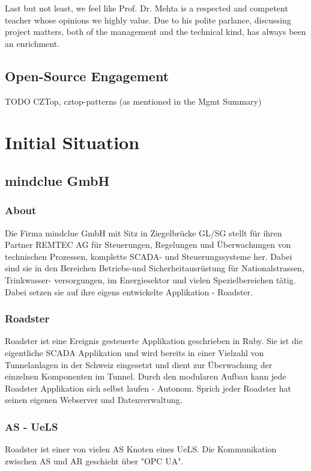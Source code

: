 Last but not least, we feel like Prof. Dr. Mehta is a respected and competent
teacher whose opinions we highly value. Due to his polite parlance, discussing
project matters, both of the management and the technical kind, has always been
an enrichment.

\subsection{Open-Source Engagement}
TODO CZTop, cztop-patterns (as mentioned in the Mgmt Summary)

\section{Initial Situation}

\subsection{mindclue GmbH}
\subsubsection{About}
Die Firma mindclue GmbH mit Sitz in Ziegelbrücke GL/SG stellt für ihren
Partner REMTEC AG für Steuerungen, Regelungen und Überwachungen von technischen Prozessen,
komplette SCADA- und Steuerungssysteme her. Dabei sind sie in den Bereichen
Betriebs-und Sicherheitausrüstung für Nationalstrassen, Trinkwasser-
versorgungen, im Energiesektor und vielen Spezielbereichen tätig.
Dabei setzen sie auf ihre eigens entwickelte Applikation - Roadster.

\subsubsection{Roadster}
Roadster ist eine Ereignis gesteuerte Applikation geschrieben in Ruby.
Sie ist die eigentliche SCADA Applikation und wird bereits in einer Vielzahl von
Tunnelanlagen in der Schweiz eingesetzt und dient zur Überwachung der einzelnen Komponenten im Tunnel.
Durch den modularen Aufbau kann jede Roadster Applikation sich selbst laufen - Autonom.
Sprich jeder Roadster hat seinen eigenen Webserver und Datenverwaltung.

\subsubsection{AS - UeLS}
Roadster ist einer von vielen AS Knoten eines UeLS. Die Kommunikation
zwischen AS und AR geschieht über "OPC UA".



